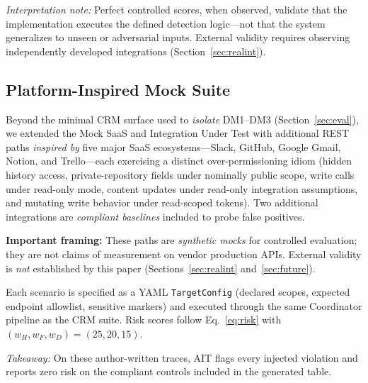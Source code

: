 \documentclass[conference]{IEEEtran}
\begin{document}
\noindent\textit{Interpretation note:} Perfect controlled scores, when
observed, validate that the implementation executes the defined
detection logic---not that the system generalizes to unseen or
adversarial inputs. External validity requires observing independently
developed integrations (Section~\ref{sec:realint}).

\subsection{Platform-Inspired Mock Suite}
\label{sec:platformmock}

Beyond the minimal CRM surface used to \emph{isolate} DM1--DM3
(Section~\ref{sec:eval}), we extended the Mock SaaS and Integration
Under Test with additional REST paths \emph{inspired by} five major
SaaS ecosystems---Slack, GitHub, Google Gmail, Notion, and Trello---each
exercising a distinct over-permissioning idiom (hidden history access,
private-repository fields under nominally public scope, write calls
under read-only mode, content updates under read-only integration
assumptions, and mutating write behavior under read-scoped tokens).
Two additional integrations are \emph{compliant baselines} included
to probe false positives.

\noindent\textbf{Important framing:} These paths are \emph{synthetic
mocks} for controlled evaluation; they are not claims of measurement
on vendor production APIs. External validity is \emph{not} established
by this paper (Sections~\ref{sec:realint} and~\ref{sec:future}).

Each scenario is specified as a YAML \texttt{TargetConfig} (declared
scopes, expected endpoint allowlist, sensitive markers) and executed
through the same Coordinator pipeline as the CRM suite. Risk scores
follow Eq.~\eqref{eq:risk} with $(w_H,w_F,w_D)=(25,20,15)$.

\begin{table}[htbp]
  \caption{Platform-Inspired Mock Results (risk scores from offline
  scenario artifacts; synthetic mocks, not vendor production APIs)}
  \label{tab:platform}
  \centering
  \renewcommand{\arraystretch}{1.2}
  \footnotesize
  \setlength{\tabcolsep}{3pt}
  
\end{table}

\noindent\textit{Takeaway:} On these author-written traces, AIT flags
every injected violation and reports zero risk on the compliant controls
included in the generated table.
\end{document}

